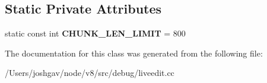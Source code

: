 \subsection*{Static Private Attributes}
\begin{DoxyCompactItemize}
\item 
static const int {\bfseries C\+H\+U\+N\+K\+\_\+\+L\+E\+N\+\_\+\+L\+I\+M\+IT} = 800\hypertarget{classv8_1_1internal_1_1_tokenizing_line_array_compare_output_a5269a7478b87f481a6a5c3e7f650a809}{}\label{classv8_1_1internal_1_1_tokenizing_line_array_compare_output_a5269a7478b87f481a6a5c3e7f650a809}

\end{DoxyCompactItemize}


The documentation for this class was generated from the following file\+:\begin{DoxyCompactItemize}
\item 
/\+Users/joshgav/node/v8/src/debug/liveedit.\+cc\end{DoxyCompactItemize}
